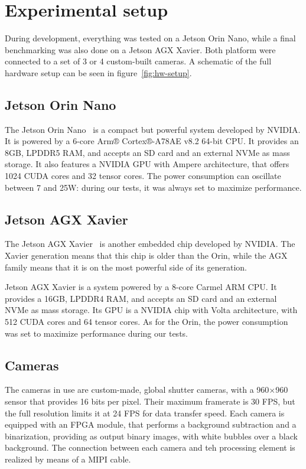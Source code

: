 \chapter{Experimental setup}
\label{chap:experim-setup}

During development, everything was tested on a Jetson Orin Nano, while a final benchmarking was also done on a Jetson AGX Xavier.
Both platform were connected to a set of 3 or 4 custom-built cameras.
A schematic of the full hardware setup can be seen in figure~\ref{fig:hw-setup}.

\section{Jetson Orin Nano}

The Jetson Orin Nano~\cite{jetson} is a compact but powerful system developed by NVIDIA.
It is powered by a 6-core Arm® Cortex®-A78AE v8.2 64-bit CPU.
It provides an 8GB, LPDDR5 RAM, and accepts an SD card and an external NVMe as mass storage.
It also features a NVIDIA GPU with Ampere architecture, that offers 1024 CUDA cores and 32 tensor cores.
The power consumption can oscillate between 7 and 25W: during our tests, it was always set to maximize performance.

\section{Jetson AGX Xavier}

The Jetson AGX Xavier~\cite{xavier} is another embedded chip developed by NVIDIA.
The Xavier generation means that this chip is older than the Orin, while the AGX family means that it is on the most powerful side of its generation.

Jetson AGX Xavier is a system powered by a 8-core Carmel ARM CPU.
It provides a 16GB, LPDDR4 RAM, and accepts an SD card and an external NVMe as mass storage.
Its GPU is a NVIDIA chip with Volta architecture, with 512 CUDA cores and 64 tensor cores.
As for the Orin, the power consumption was set to maximize performance during our tests.

\section{Cameras}

The cameras in use are custom-made, global shutter cameras, with a 960{$\times$}960 sensor that provides 16 bits per pixel.
Their maximum framerate is 30 FPS, but the full resolution limits it at 24 FPS for data transfer speed.
Each camera is equipped with an FPGA module, that performs a background subtraction and a binarization, providing as output binary images, with white bubbles over a black background.
The connection between each camera and teh processing element is realized by means of a MIPI cable.

